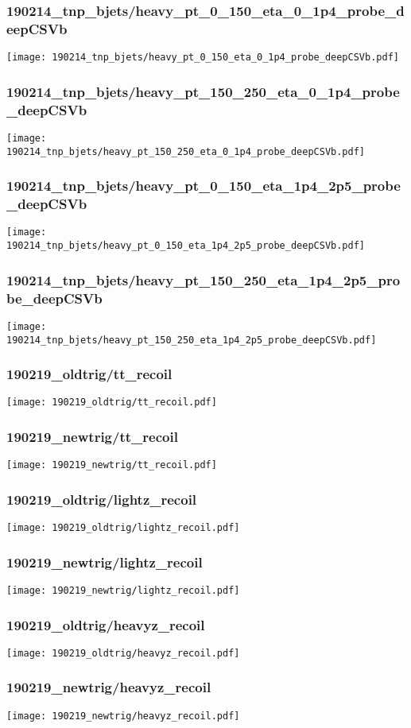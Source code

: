 \begin{frame}
   \frametitle{\small 190214\_tnp\_bjets/heavy\_pt\_0\_150\_eta\_0\_1p4\_probe\_deepCSVb}
   \centering
   \texttt{[image: 190214\_tnp\_bjets/heavy\_pt\_0\_150\_eta\_0\_1p4\_probe\_deepCSVb.pdf]}
\end{frame}

\begin{frame}
   \frametitle{\small 190214\_tnp\_bjets/heavy\_pt\_150\_250\_eta\_0\_1p4\_probe\_deepCSVb}
   \centering
   \texttt{[image: 190214\_tnp\_bjets/heavy\_pt\_150\_250\_eta\_0\_1p4\_probe\_deepCSVb.pdf]}
\end{frame}

\begin{frame}
   \frametitle{\small 190214\_tnp\_bjets/heavy\_pt\_0\_150\_eta\_1p4\_2p5\_probe\_deepCSVb}
   \centering
   \texttt{[image: 190214\_tnp\_bjets/heavy\_pt\_0\_150\_eta\_1p4\_2p5\_probe\_deepCSVb.pdf]}
\end{frame}

\begin{frame}
   \frametitle{\small 190214\_tnp\_bjets/heavy\_pt\_150\_250\_eta\_1p4\_2p5\_probe\_deepCSVb}
   \centering
   \texttt{[image: 190214\_tnp\_bjets/heavy\_pt\_150\_250\_eta\_1p4\_2p5\_probe\_deepCSVb.pdf]}
\end{frame}

\begin{frame}
   \frametitle{\small 190219\_oldtrig/tt\_recoil}
   \centering
   \texttt{[image: 190219\_oldtrig/tt\_recoil.pdf]}
\end{frame}

\begin{frame}
   \frametitle{\small 190219\_newtrig/tt\_recoil}
   \centering
   \texttt{[image: 190219\_newtrig/tt\_recoil.pdf]}
\end{frame}

\begin{frame}
   \frametitle{\small 190219\_oldtrig/lightz\_recoil}
   \centering
   \texttt{[image: 190219\_oldtrig/lightz\_recoil.pdf]}
\end{frame}

\begin{frame}
   \frametitle{\small 190219\_newtrig/lightz\_recoil}
   \centering
   \texttt{[image: 190219\_newtrig/lightz\_recoil.pdf]}
\end{frame}

\begin{frame}
   \frametitle{\small 190219\_oldtrig/heavyz\_recoil}
   \centering
   \texttt{[image: 190219\_oldtrig/heavyz\_recoil.pdf]}
\end{frame}

\begin{frame}
   \frametitle{\small 190219\_newtrig/heavyz\_recoil}
   \centering
   \texttt{[image: 190219\_newtrig/heavyz\_recoil.pdf]}
\end{frame}

